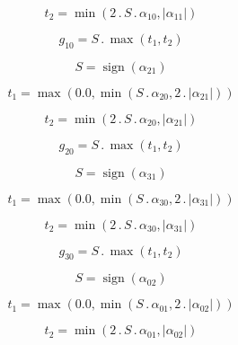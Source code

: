 \documentclass{article}
\begin{document}
\begin{dmath}t_{2} = \min\left(2 \,.\, S \,.\, \alpha_{10}, \left|{\alpha_{11}}\right|\right)\end{dmath}

\begin{dmath}g_{10} = S \,.\, \max\left(t_{1}, t_{2}\right)\end{dmath}

\begin{dmath}S = \operatorname{sign}{\left (\alpha_{21} \right )}\end{dmath}

\begin{dmath}t_{1} = \max\left(0.0, \min\left(S \,.\, \alpha_{20}, 2 \,.\, \left|{\alpha_{21}}\right|\right)\right)\end{dmath}

\begin{dmath}t_{2} = \min\left(2 \,.\, S \,.\, \alpha_{20}, \left|{\alpha_{21}}\right|\right)\end{dmath}

\begin{dmath}g_{20} = S \,.\, \max\left(t_{1}, t_{2}\right)\end{dmath}

\begin{dmath}S = \operatorname{sign}{\left (\alpha_{31} \right )}\end{dmath}

\begin{dmath}t_{1} = \max\left(0.0, \min\left(S \,.\, \alpha_{30}, 2 \,.\, \left|{\alpha_{31}}\right|\right)\right)\end{dmath}

\begin{dmath}t_{2} = \min\left(2 \,.\, S \,.\, \alpha_{30}, \left|{\alpha_{31}}\right|\right)\end{dmath}

\begin{dmath}g_{30} = S \,.\, \max\left(t_{1}, t_{2}\right)\end{dmath}

\begin{dmath}S = \operatorname{sign}{\left (\alpha_{02} \right )}\end{dmath}

\begin{dmath}t_{1} = \max\left(0.0, \min\left(S \,.\, \alpha_{01}, 2 \,.\, \left|{\alpha_{02}}\right|\right)\right)\end{dmath}

\begin{dmath}t_{2} = \min\left(2 \,.\, S \,.\, \alpha_{01}, \left|{\alpha_{02}}\right|\right)\end{dmath}
\end{document}
